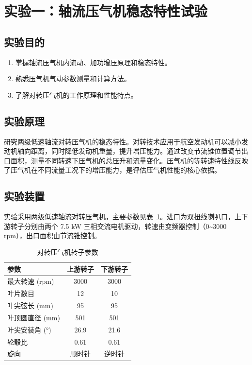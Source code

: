 
\section{实验一：轴流压气机稳态特性试验}

\subsection{实验目的}

\begin{enumerate}
    \item 掌握轴流压气机内流动、加功增压原理和稳态特性。
    \item 熟悉压气机气动参数测量和计算方法。
    \item 了解对转压气机的工作原理和性能特点。
\end{enumerate}

\subsection{实验原理}

研究两级低速轴流对转压气机的稳态特性。对转技术应用于航空发动机可以减小发动机轴向距离，同时降低发动机重量，提升增压能力。通过改变节流锥位置调节出口面积，测量不同转速下压气机的总压升和流量变化。压气机的等转速特性线反映了压气机在不同流量工况下的增压能力，是评估压气机性能的核心依据。

\subsection{实验装置}

实验采用两级低速轴流对转压气机，主要参数见表~\ref{tab:rotor_params}。进口为双扭线喇叭口，上下游转子分别由两个 7.5 kW 三相交流电机驱动，转速由变频器控制（0\textasciitilde3000 rpm），出口面积由节流锥控制。

\begin{table}[H]
\centering
\caption{对转压气机转子参数}
\label{tab:rotor_params}
\begin{tabular}{lcc}
\toprule
参数 & 上游转子 & 下游转子 \\
\midrule
最大转速 (rpm) & 3000 & 3000 \\
叶片数目 & 12 & 10 \\
叶尖弦长 (mm) & 95 & 95 \\
叶顶圆直径 (mm) & 501 & 501 \\
叶尖安装角 (°) & 26.9 & 21.6 \\
轮毂比 & 0.61 & 0.61 \\
旋向 & 顺时针 & 逆时针 \\
\bottomrule
\end{tabular}
\end{table}

